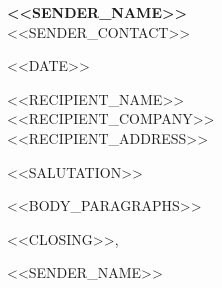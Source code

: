 \documentclass[11pt]{article}
\begin{document}
\begin{center}
    {\fontsize{36}{36}\selectfont\textbf{<<SENDER_NAME>>}} \\ \bigskip
    <<SENDER_CONTACT>>
\end{center}

\vspace{2em}

\noindent <<DATE>>

\vspace{2em}
\noindent <<RECIPIENT_NAME>> \\
<<RECIPIENT_COMPANY>> \\
<<RECIPIENT_ADDRESS>>

\vspace{2em}
\noindent <<SALUTATION>>

\vspace{1em}
<<BODY_PARAGRAPHS>>

\vspace{2em}
\noindent <<CLOSING>>,

\vspace{2em}
\noindent <<SENDER_NAME>>
\end{document}
